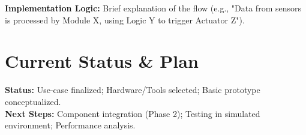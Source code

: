 \documentclass[11pt, a4paper]{article}
\begin{document}
\textbf{Implementation Logic:} Brief explanation of the flow (e.g., "Data from sensors is processed by Module X, using Logic Y to trigger Actuator Z").

\section{Current Status \& Plan}
\textbf{Status:} Use-case finalized; Hardware/Tools selected; Basic prototype conceptualized. \\
\textbf{Next Steps:} Component integration (Phase 2); Testing in simulated environment; Performance analysis.

\vspace{0.2cm}
\renewcommand{\refname}{\normalsize References}

\end{document}
